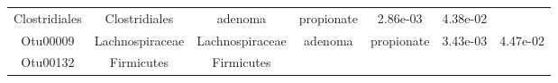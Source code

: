 \documentclass[11pt,]{article}
\begin{document}
\begin{longtable}[]{@{}ccccccc@{}}
\begin{minipage}[t]{0.17\columnwidth}
Clostridiales\strut
\end{minipage} & \begin{minipage}[t]{0.17\columnwidth}\centering\strut
Clostridiales\strut
\end{minipage} & \begin{minipage}[t]{0.09\columnwidth}\centering\strut
adenoma\strut
\end{minipage} & \begin{minipage}[t]{0.11\columnwidth}\centering\strut
propionate\strut
\end{minipage} & \begin{minipage}[t]{0.09\columnwidth}\centering\strut
2.86e-03\strut
\end{minipage} & \begin{minipage}[t]{0.09\columnwidth}\centering\strut
4.38e-02\strut
\end{minipage}\tabularnewline
\begin{minipage}[t]{0.09\columnwidth}\centering\strut
Otu00009\strut
\end{minipage} & \begin{minipage}[t]{0.17\columnwidth}\centering\strut
Lachnospiraceae\strut
\end{minipage} & \begin{minipage}[t]{0.17\columnwidth}\centering\strut
Lachnospiraceae\strut
\end{minipage} & \begin{minipage}[t]{0.09\columnwidth}\centering\strut
adenoma\strut
\end{minipage} & \begin{minipage}[t]{0.11\columnwidth}\centering\strut
propionate\strut
\end{minipage} & \begin{minipage}[t]{0.09\columnwidth}\centering\strut
3.43e-03\strut
\end{minipage} & \begin{minipage}[t]{0.09\columnwidth}\centering\strut
4.47e-02\strut
\end{minipage}\tabularnewline
\begin{minipage}[t]{0.09\columnwidth}\centering\strut
Otu00132\strut
\end{minipage} & \begin{minipage}[t]{0.17\columnwidth}\centering\strut
Firmicutes\strut
\end{minipage} & \begin{minipage}[t]{0.17\columnwidth}\centering\strut
Firmicutes\strut
\end{minipage} & \begin{minipage}[t]{0.09\columnwidth}\centering\strut

\end{minipage}
\end{longtable}
\end{document}
